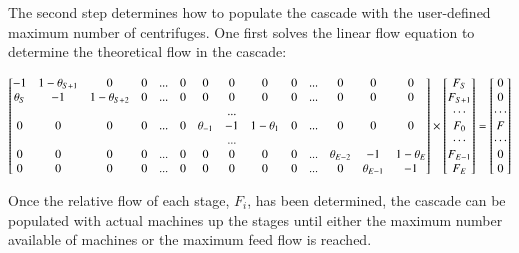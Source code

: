 \documentclass{anstrans}
\begin{document}
The second step determines how to populate the cascade with the user-defined maximum number of centrifuges. One first solves the linear flow equation to determine the theoretical flow in the
cascade:
\begin{strip}
\begin{equation}
\setcounter{MaxMatrixCols}{20}
\begin{bmatrix}
-1         & 1-\theta_{S+1} & 0              & 0 & ... & 0 & 0            & 0   & 0              & 0 & ... & 0            & 0            & 0 \\
\theta_{S} & -1             & 1-\theta_{S+2} & 0 & ... & 0 & 0            & 0   & 0              & 0 & ... & 0            & 0            & 0 \\
           &                &                &   &     &   &              & ... &                &   &     &              &              &   \\
0          & 0              & 0              & 0 & ... & 0 & \theta_{-1}  & -1  & 1 - \theta_{1} & 0 & ... & 0            & 0            & 0 \\
           &                &                &   &     &   &              & ... &                &   &     &              &              &   \\
0          & 0              & 0              & 0 & ... & 0 & 0            & 0   & 0              & 0 & ... & \theta_{E-2} & -1           & 1-\theta_{E} \\
0          & 0              & 0              & 0 & ... & 0 & 0            & 0   & 0              & 0 & ... & 0            & \theta_{E-1} & -1
\end{bmatrix}
\times
\begin{bmatrix}
     F_{S}   \\
     F_{S+1} \\
     \cdots  \\
     F_{0}   \\
    \cdots   \\
    F_{E-1}  \\
    F_{E}
\end{bmatrix}
=
\begin{bmatrix}
     0   \\
     0 \\
     \cdots  \\
     F   \\
    \cdots   \\
    0  \\
    0
\end{bmatrix}
\label{eq:flow}
\end{equation}
\end{strip}
Once the relative flow of each stage, $F_{i}$, has been determined, the
cascade can be populated with actual machines up the stages
until either the maximum number available of machines or the maximum feed
flow is reached.
\end{document}
